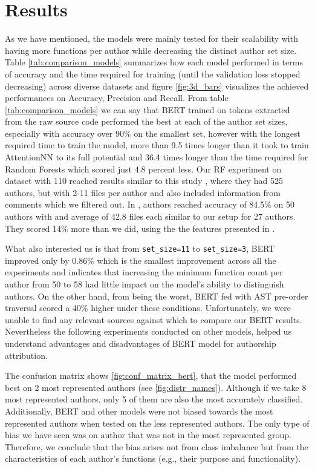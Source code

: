 \documentclass[conference]{IEEEtran}
\begin{document}
\section{Results}

As we have mentioned, the models were mainly tested for their scalability with having more functions per author while decreasing the distinct author set size.
Table \ref{tab:comparison_models} summarizes how each model performed in terms of accuracy and the time required for training (until the validation loss stopped decreasing) across diverse datasets
and figure \ref{fig:3d_bars} visualizes the achieved performances on Accuracy, Precision and Recall. From table \ref{tab:comparison_models} we can say that BERT 
trained on tokens extracted from the raw source code performed the best at each of the author set sizes, especially with accuracy over 90\% on the smallest set, however with the longest required time to train the model, more than 
9.5 times longer than it took to train AttentionNN to its full potential and 36.4 times longer than the time required for Random Forests which scored just 4.8 percent less. Our RF experiment on dataset with 110 reached results similar to this study \citet{rf1}, 
where they had 525 authors, but with 2-11 files per author and also included information from comments which we filtered out. In \citet{rf2}, authors reached accuracy of 84.5\% on 50 authors with and average of 42.8 files each similar to our setup for 
27 authors. They scored 14\% more than we did, using the the features presented in \citet{caliskan}.

What also interested us is that from \texttt{set\_size=11} to \texttt{set\_size=3}, BERT improved only by 0.86\% which is the smallest improvement across all the experiments and indicates that increasing the minimum function 
count per author from 50 to 58 had little impact on the model's ability to distinguish authors. 
On the other hand, from being the worst, BERT fed with AST pre-order traversal scored a 40\% higher under these conditions. Unfortunately, we were unable to find any relevant sources against which to compare our BERT results.
Nevertheless the following experiments conducted on other models, helped us understand advantages and disadvantages of BERT model for authorship attribution.

The confusion matrix shows \ref{fig:conf_matrix_bert}, that the model performed best on 2 most represented authors
(see \ref{fig:distr_names}). Although if we take 8 most represented authors, only 5 of them are also 
the most accurately classified. Additionally, BERT and other models were not biased towards the most represented authors when tested on the 
less represented authors. The only type of bias we have seen was on author that was not in the most represented group. Therefore, we conclude 
that the bias arises not from class imbalance but from the characteristics of each author’s 
functions (e.g., their purpose and functionality).
\end{document}
